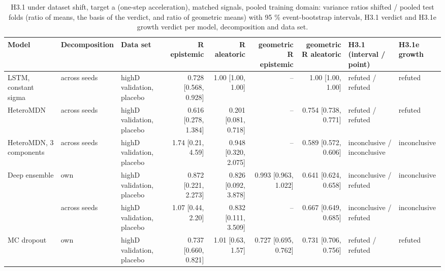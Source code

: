 \begin{table}[htbp]
\centering
\footnotesize
\caption{H3.1 under dataset shift, target a (one-step acceleration), matched signals, pooled training domain: variance ratios shifted / pooled test folds (ratio of means, the basis of the verdict, and ratio of geometric means) with 95 \% event-bootstrap intervals, H3.1 verdict and H3.1e growth verdict per model, decomposition and data set.}
\label{tab:t2-h31--pool--a}
\begin{tabular}{lllrrrrll}
\toprule
Model & Decomposition & Data set & R epistemic & R aleatoric & geometric R epistemic & geometric R aleatoric & H3.1 (interval / point) & H3.1e growth \\
\midrule
LSTM, constant sigma & across seeds & highD validation, placebo & 0.728 [0.568, 0.928] & 1.00 [1.00, 1.00] & -- & 1.00 [1.00, 1.00] & refuted / refuted & refuted \\
\midrule
HeteroMDN & across seeds & highD validation, placebo & 0.616 [0.278, 1.384] & 0.201 [0.081, 0.718] & -- & 0.754 [0.738, 0.771] & refuted / refuted & refuted \\
\midrule
HeteroMDN, 3 components & across seeds & highD validation, placebo & 1.74 [0.21, 4.59] & 0.948 [0.320, 2.075] & -- & 0.589 [0.572, 0.606] & inconclusive / inconclusive & inconclusive \\
\midrule
Deep ensemble & own & highD validation, placebo & 0.872 [0.221, 2.273] & 0.826 [0.092, 3.878] & 0.993 [0.963, 1.022] & 0.641 [0.624, 0.658] & inconclusive / refuted & inconclusive \\
\midrule
 & across seeds & highD validation, placebo & 1.07 [0.44, 2.20] & 0.832 [0.111, 3.509] & -- & 0.667 [0.649, 0.685] & inconclusive / refuted & inconclusive \\
\midrule
MC dropout & own & highD validation, placebo & 0.737 [0.660, 0.821] & 1.01 [0.63, 1.57] & 0.727 [0.695, 0.762] & 0.731 [0.706, 0.756] & refuted / refuted & refuted \\
\midrule

\end{tabular}
\end{table}
